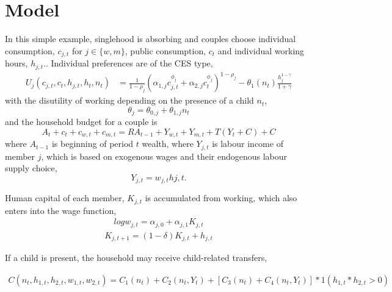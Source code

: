 \documentclass{article}
\begin{document}
\section{Model}

In this simple example, singlehood is absorbing and couples choose
individual consumption, $c_{j,t}$ for $j\in\{w,m\}$, public consumption,
$c_{t}$ and individual working hours, $h_{j,t}$..  Individual preferences are of the CES type,
\begin{align*}
U_{j}(c_{j,t},c_{t}, h_{j,t}, h_{t}, n_t) & =\frac{1}{1-\rho_{j}}{\left(\alpha_{1,j}c_{j,t}^{\phi_{j}}+\alpha_{2,j}c_{t}^{\phi_{j}}\right)^{1-\rho_{j}} - \theta_1(n_t)\frac{h_j^{1-\gamma}}{1+\gamma}}
\end{align*}
with the disutility of working depending on the presence of a child $n_t$,
$$
\theta_j = \theta_{0, j} + \theta_{1, j} n_t
$$
and the household budget for a couple is
$$
A_{t}+c_{t}+c_{w,t}+c_{m,t}=RA_{t-1}+Y_{w,t}+Y_{m,t} + T(Y_t + C) + C 
$$
where $A_{t-1}$ is beginning of period $t$ wealth, where $Y_{j,t}$ is labour income of member $j$, which is based on exogenous wages and their endogenous labour supply choice, 
$$
Y_{j,t} = w_{j, t} h{j, t}.
$$

Human capital of each member, $K_{j,t}$ is accumulated from working, which also enters into the wage function,
\begin{align}
log w_{j,t} = \alpha_{j,0} + \alpha_{j,1}K_{j,t}
\end{align}
\begin{align}
K_{j,t+1} = (1-\delta)K_{j,t} + h_{j,t}
\end{align}

If a child is present, the household may receive child-related transfers, 

\begin{align}
C(n_t, h_{1,t}, h_{2,t}, w_{1,t}, w_{2,t}) = C_1(n_t) + C_2(n_t, Y_t) + [C_3(n_t)+C_4(n_t, Y_t)] * 1(h_{1,t} * h_{2,t}>0)
\end{align}
\end{document}
